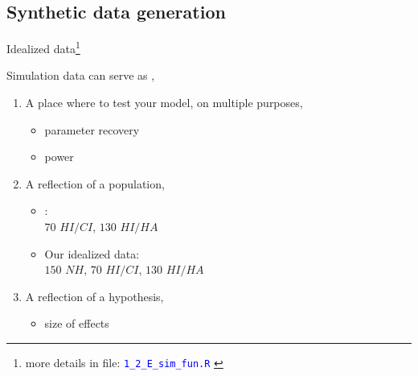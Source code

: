 \subsection{Synthetic data generation}
%
%
\begin{frame}[t, negative]
	\subsectionpage
\end{frame}
%
%
\begin{lhframe}[rhgraphic={\texttt{[image: sim\_code1.png]}}]
	{Idealized data\footnote{more details in file: \textcolor{blue}{\texttt{1\_2\_E\_sim\_fun.R} }}}
	
	Simulation data can serve as \cite{Kruschke_2014, McElreath_2020},
	\begin{enumerate}
		\item A place where to test your model, on multiple purposes,
		\begin{itemize}
			\item parameter recovery
			\item power
		\end{itemize}
		\item A reflection of a population, 
		\begin{itemize}
			\item \citet{DeRaeve_2016}: \\
			$70$ $HI/CI$, $130$ $HI/HA$
			\item Our idealized data: \\
			$150$ $NH$, $70$ $HI/CI$, $130$ $HI/HA$
		\end{itemize}
		\item A reflection of a hypothesis,
		\begin{itemize}
			\item size of effects
		\end{itemize}
	\end{enumerate}
\end{lhframe}
%
%

